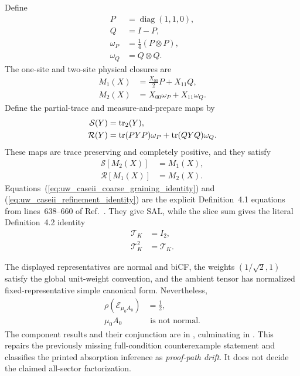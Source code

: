 \documentclass{article}
\begin{document}
Define
\begin{align}
    P
    &=\operatorname{diag}(1,1,0),
    \label{eq:uw_caseii_projection_p}\\
    Q
    &=I-P,
    \label{eq:uw_caseii_projection_q}\\
    \omega_P
    &=\tfrac14(P\otimes P),
    \label{eq:uw_caseii_state_p}\\
    \omega_Q
    &=Q\otimes Q.
    \label{eq:uw_caseii_state_q}
\end{align}
The one-site and two-site physical closures are
\begin{align}
    M_1(X)
    &=\tfrac{X_{00}}2P+X_{11}Q,
    \label{eq:uw_caseii_one_site_closure}\\
    M_2(X)
    &=X_{00}\omega_P+X_{11}\omega_Q.
    \label{eq:uw_caseii_two_site_closure}
\end{align}
Define the partial-trace and measure-and-prepare maps by
\begin{align}
    \mathcal S(Y)
    &=\operatorname{tr}_2(Y),
    \label{eq:uw_caseii_coarse_graining_map}\\
    \mathcal R(Y)
    &=\operatorname{tr}(PYP)\omega_P+\operatorname{tr}(QYQ)\omega_Q.
    \label{eq:uw_caseii_refinement_map}
\end{align}
These maps are trace preserving and completely positive, and they satisfy
\begin{align}
    \mathcal S[M_2(X)]
    &=M_1(X),
    \label{eq:uw_caseii_coarse_graining_identity}\\
    \mathcal R[M_1(X)]
    &=M_2(X).
    \label{eq:uw_caseii_refinement_identity}
\end{align}
Equations~(\ref{eq:uw_caseii_coarse_graining_identity}) and
(\ref{eq:uw_caseii_refinement_identity}) are the explicit Definition~4.1
equations from lines~638--660 of Ref.~\cite{Cirac2016MPDO_arXiv}. They give
SAL, while the slice sum gives the literal Definition~4.2 identity
\begin{align}
    \mathcal T_K
    &=I_2,
    \label{eq:uw_caseii_transfer_identity}\\
    \mathcal T_K^2
    &=\mathcal T_K.
    \label{eq:uw_caseii_transfer_idempotence}
\end{align}

The displayed representatives are normal and biCF, the weights
$(1/\sqrt2,1)$ satisfy the global unit-weight convention, and the ambient
tensor has normalized fixed-representative simple canonical form.
Nevertheless,
\begin{align}
    \rho(\mathcal E_{\mu_0A_0})
    &=\frac12,
    \label{eq:uw_caseii_absorbed_spectral_radius}\\
    \mu_0A_0
    &\text{ is not normal}.
    \label{eq:uw_caseii_absorbed_not_normal}
\end{align}
The component results and their conjunction are in
, culminating in
.
This repairs the previously missing full-condition counterexample statement
and classifies the printed absorption inference as \emph{proof-path drift}. It
does not decide the claimed all-sector factorization.
\end{document}
